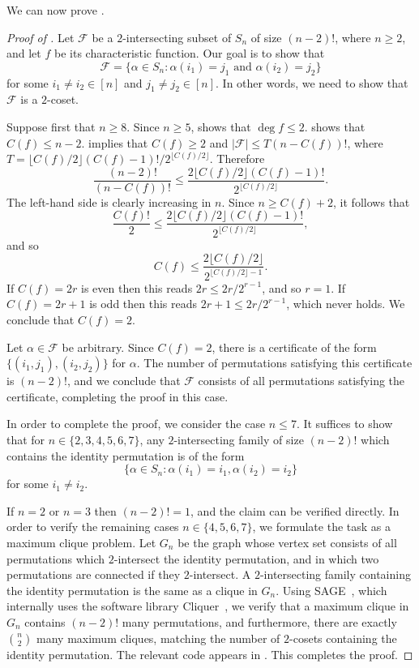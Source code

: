 \documentclass[10pt,a4paper]{amsart}
\theoremstyle{definition}
\begin{document}
We can now prove .

\begin{proof}[Proof of ]
Let $\mathcal{F}$ be a $2$-intersecting subset of $S_n$ of size $(n-2)!$, where $n \geq 2$, and let $f$ be its characteristic function. Our goal is to show that
\[
 \mathcal{F} = \{ \alpha \in S_n : \alpha(i_1) = j_1 \text{ and } \alpha(i_2) = j_2 \}
\]
for some $i_1 \neq i_2 \in [n]$ and $j_1 \neq j_2 \in [n]$. In other words, we need to show that $\mathcal{F}$ is a $2$-coset.

Suppose first that $n \geq 8$. Since $n \geq 5$,  shows that $\deg f \leq 2$.  shows that $C(f) \leq n-2$.  implies that $C(f) \geq 2$ and $|\mathcal{F}| \leq T (n - C(f))!$, where $T = \lfloor C(f)/2 \rfloor (C(f) - 1)!/2^{\lfloor C(f)/2 \rfloor}$. Therefore
\[
 \frac{(n-2)!}{(n - C(f))!} \leq \frac{2\lfloor C(f)/2 \rfloor (C(f) - 1)!}{2^{\lfloor C(f)/2 \rfloor}}.
\]
The left-hand side is clearly increasing in $n$. Since $n \geq C(f) + 2$, it follows that
\[
 \frac{C(f)!}{2} \leq \frac{2\lfloor C(f)/2 \rfloor (C(f) - 1)!}{2^{\lfloor C(f)/2 \rfloor}},
\]
and so
\[
 C(f) \leq \frac{2 \lfloor C(f)/2 \rfloor}{2^{\lfloor C(f)/2 \rfloor - 1}}.
\]
If $C(f) = 2r$ is even then this reads $2r \leq 2r/2^{r-1}$, and so $r = 1$. If $C(f) = 2r+1$ is odd then this reads $2r+1 \leq 2r/2^{r-1}$, which never holds. We conclude that $C(f) = 2$.

Let $\alpha \in \mathcal{F}$ be arbitrary. Since $C(f) = 2$, there is a certificate of the form $\{(i_1,j_1),(i_2,j_2)\}$ for $\alpha$. The number of permutations satisfying this certificate is $(n-2)!$, and we conclude that $\mathcal{F}$ consists of all permutations satisfying the certificate, completing the proof in this case.

\smallskip

In order to complete the proof, we consider the case $n \leq 7$. It suffices to show that for $n \in \{2,3,4,5,6,7\}$, any $2$-intersecting family of size $(n-2)!$ which contains the identity permutation is of the form
\[
 \{ \alpha \in S_n : \alpha(i_1) = i_1, \alpha(i_2) = i_2 \}
\]
for some $i_1 \neq i_2$.

If $n = 2$ or $n = 3$ then $(n-2)! = 1$, and the claim can be verified directly. In order to verify the remaining cases $n \in \{4,5,6,7\}$, we formulate the task as a maximum clique problem. Let $G_n$ be the graph whose vertex set consists of all permutations which $2$-intersect the identity permutation, and in which two permutations are connected if they $2$-intersect. A $2$-intersecting family containing the identity permutation is the same as a clique in $G_n$. Using SAGE~\cite{sagemath}, which internally uses the software library Cliquer~\cite{Cliquer}, we verify that a maximum clique in $G_n$ contains $(n-2)!$ many permutations, and furthermore, there are exactly $\binom{n}{2}$ many maximum cliques, matching the number of $2$-cosets containing the identity permutation. The relevant code appears in . This completes the proof.
\end{proof}
\end{document}
